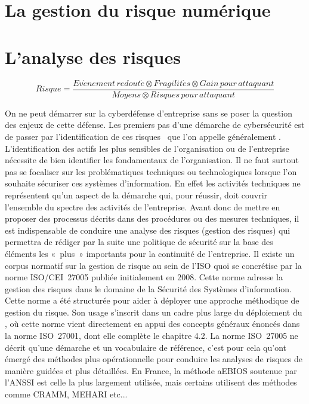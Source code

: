 
\section{La gestion du risque numérique}


\utodo

\section{L'analyse des risques}

\begin{nota}
\begin{equation}
Risque = \frac{Ev\grave{e}nement\,redout\acute{e}\otimes Fragilit\acute{e}s\otimes Gain\,pour\,attaquant}{Moyens\otimes Risques\,pour\,attaquant}
\end{equation}
\end{nota}


On ne peut démarrer sur la cyberdéfense d’entreprise sans se poser la question des enjeux de cette défense. Les premiers pas d’une démarche de cybersécurité est de passer  par l’identification de ces risques  que l’on appelle généralement .
L’identification des actifs les plus sensibles de l’organisation ou de l’entreprise nécessite de bien identifier les fondamentaux de l’organisation.
Il ne faut surtout pas se focaliser sur les problématiques techniques ou technologiques lorsque l’on souhaite sécuriser ces systèmes d’information. En effet les activités techniques   ne représentent qu’un aspect de la  démarche qui, pour réussir, doit couvrir l’ensemble du spectre des  activités de l'entreprise.
Avant donc de mettre en proposer des processus décrits dans des procédures ou des mesures techniques, il est indispensable de conduire une analyse des risques (gestion des risques) qui permettra de rédiger par la suite une politique de sécurité sur la base des éléments les « plus » importants pour la continuité de l’entreprise.
Il existe un corpus normatif sur la gestion de risque au sein de l’ISO quoi se concrétise par la norme ISO/CEI~27005 publiée initialement en 2008. Cette norme adresse la gestion des risques dans le domaine de la Sécurité des Systèmes d'information.
Cette norme a été structurée pour aider à déployer une approche méthodique de gestion du risque. Son usage s’inscrit dans un cadre plus large du déploiement du ,  où cette norme vient directement en appui des concepts généraux énoncés dans la norme ISO~27001, dont elle complète le chapitre 4.2.
La norme ISO~27005 ne décrit qu'une démarche et un vocabulaire de référence, c’est pour cela qu’ont émergé des méthodes plus opérationnelle pour conduire les analyses de risques de manière guidées et plus détaillées. En France, la méthode \gls{aEBIOS} soutenue par l’ANSSI est celle la plus largement utilisée, mais certains utilisent des méthodes comme CRAMM, MEHARI etc...

